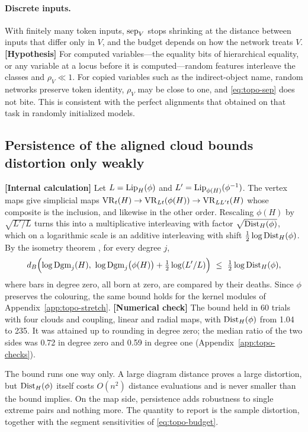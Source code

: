 \documentclass[11pt,a4paper]{article}
\newcommand{\evl}[2]{{\small\bfseries\color{#1}[#2]}}
\newcommand{\LCalc}{\evl{ccalc}{Internal calculation}}
\newcommand{\LNum}{\evl{cnum}{Numerical check}}
\newcommand{\LHyp}{\evl{chyp}{Hypothesis}}
\begin{document}
\paragraph{Discrete inputs.} With finitely many token inputs, $\operatorname{sep}_V$ stops
shrinking at the distance between inputs that differ only in $V$, and the
budget depends on how the network treats $V$. \LHyp{} For computed
variables---the equality bits of hierarchical equality, or any variable at a
locus before it is computed---random features interleave the classes and
$\rho_V\ll1$. For copied variables such as the indirect-object name, random
networks preserve token identity, $\rho_V$ may be close to one, and
\eqref{eq:topo-sep} does not bite. This is consistent with the perfect
alignments that \cite{sutter2025} obtained on that task in randomly
initialized models.

\subsection{Persistence of the aligned cloud bounds distortion only weakly}
\label{app:topo-interleave}

\LCalc{} Let $L=\operatorname{Lip}_H(\phi)$ and $L'=\operatorname{Lip}_{\phi(H)}(\phi^{-1})$. The vertex
maps give simplicial maps $\mathrm{VR}_t(H)\to\mathrm{VR}_{Lt}(\phi(H))\to\mathrm{VR}_{LL't}(H)$ whose
composite is the inclusion, and likewise in the other order. Rescaling
$\phi(H)$ by $\sqrt{L'/L}$ turns this into a multiplicative interleaving with
factor $\sqrt{\operatorname{Dist}_H(\phi)}$, which on a logarithmic scale is an additive
interleaving with shift $\tfrac12\log\operatorname{Dist}_H(\phi)$. By the isometry theorem
\cite{chazal2016}, for every degree $j$,
\begin{equation}
d_B\Bigl(\log\Dgm_j(H),\ \log\Dgm_j\bigl(\phi(H)\bigr)+\tfrac12\log(L'/L)\Bigr)
\ \le\ \tfrac12\log\Dist_H(\phi),
\label{eq:topo-interleave}
\end{equation}
where bars in degree zero, all born at zero, are compared by their deaths.
Since $\phi$ preserves the colouring, the same bound holds for the kernel
modules of Appendix~\ref{app:topo-stretch}. \LNum{} The bound held in 60
trials with four clouds and coupling, linear and radial maps, with
$\operatorname{Dist}_H(\phi)$ from 1.04 to 235. It was attained up to rounding in degree
zero; the median ratio of the two sides was 0.72 in degree zero and 0.59 in
degree one (Appendix~\ref{app:topo-checks}).

The bound runs one way only. A large diagram distance proves a large
distortion, but $\operatorname{Dist}_H(\phi)$ itself costs $O(n^2)$ distance evaluations and
is never smaller than the bound implies. On the map side, persistence adds
robustness to single extreme pairs and nothing more. The quantity to report
is the sample distortion, together with the segment sensitivities of
\eqref{eq:topo-budget}.
\end{document}
